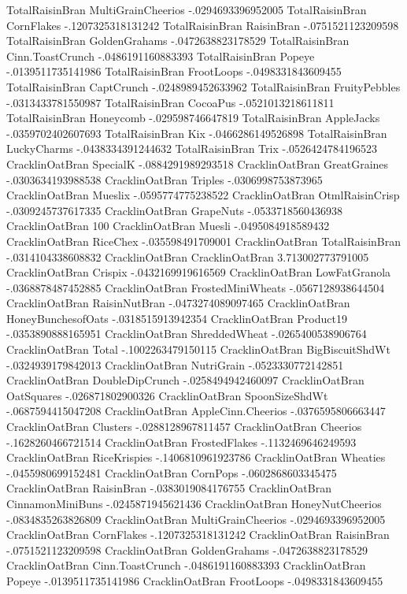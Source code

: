 TotalRaisinBran	MultiGrainCheerios	-.0294693396952005
TotalRaisinBran	CornFlakes	-.1207325318131242
TotalRaisinBran	RaisinBran	-.0751521123209598
TotalRaisinBran	GoldenGrahams	-.0472638823178529
TotalRaisinBran	Cinn.ToastCrunch	-.0486191160883393
TotalRaisinBran	Popeye	-.0139511735141986
TotalRaisinBran	FrootLoops	-.0498331843609455
TotalRaisinBran	CaptCrunch	-.0248989452633962
TotalRaisinBran	FruityPebbles	-.0313433781550987
TotalRaisinBran	CocoaPus	-.0521013218611811
TotalRaisinBran	Honeycomb	-.029598746647819
TotalRaisinBran	AppleJacks	-.0359702402607693
TotalRaisinBran	Kix	-.0466286149526898
TotalRaisinBran	LuckyCharms	-.0438334391244632
TotalRaisinBran	Trix	-.0526424784196523
CracklinOatBran	SpecialK	-.0884291989293518
CracklinOatBran	GreatGraines	-.0303634193988538
CracklinOatBran	Triples	-.0306998753873965
CracklinOatBran	Mueslix	-.0595774775238522
CracklinOatBran	OtmlRaisinCrisp	-.0309245737617335
CracklinOatBran	GrapeNuts	-.0533718560436938
CracklinOatBran	100%
CracklinOatBran	Muesli	-.0495084918589432
CracklinOatBran	RiceChex	-.035598491709001
CracklinOatBran	TotalRaisinBran	-.0314104338608832
CracklinOatBran	CracklinOatBran	3.713002773791005
CracklinOatBran	Crispix	-.0432169919616569
CracklinOatBran	LowFatGranola	-.0368878487452885
CracklinOatBran	FrostedMiniWheats	-.0567128938644504
CracklinOatBran	RaisinNutBran	-.0473274089097465
CracklinOatBran	HoneyBunchesofOats	-.0318515913942354
CracklinOatBran	Product19	-.0353890888165951
CracklinOatBran	ShreddedWheat	-.0265400538906764
CracklinOatBran	Total	-.1002263479150115
CracklinOatBran	BigBiscuitShdWt	-.0324939179842013
CracklinOatBran	NutriGrain	-.0523330772142851
CracklinOatBran	DoubleDipCrunch	-.0258494942460097
CracklinOatBran	OatSquares	-.026871802900326
CracklinOatBran	SpoonSizeShdWt	-.0687594415047208
CracklinOatBran	AppleCinn.Cheerios	-.0376595806663447
CracklinOatBran	Clusters	-.0288128967811457
CracklinOatBran	Cheerios	-.1628260466721514
CracklinOatBran	FrostedFlakes	-.1132469646249593
CracklinOatBran	RiceKrispies	-.1406810961923786
CracklinOatBran	Wheaties	-.0455980699152481
CracklinOatBran	CornPops	-.0602868603345475
CracklinOatBran	RaisinBran	-.0383019084176755
CracklinOatBran	CinnamonMiniBuns	-.0245871945621436
CracklinOatBran	HoneyNutCheerios	-.0834835263826809
CracklinOatBran	MultiGrainCheerios	-.0294693396952005
CracklinOatBran	CornFlakes	-.1207325318131242
CracklinOatBran	RaisinBran	-.0751521123209598
CracklinOatBran	GoldenGrahams	-.0472638823178529
CracklinOatBran	Cinn.ToastCrunch	-.0486191160883393
CracklinOatBran	Popeye	-.0139511735141986
CracklinOatBran	FrootLoops	-.0498331843609455

